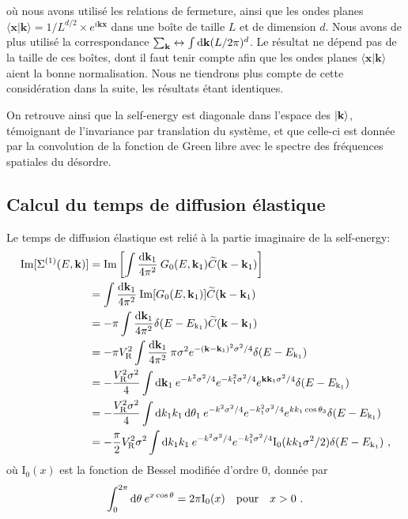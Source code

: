 où nous avons utilisé les relations de fermeture, ainsi que les ondes planes $\langle\mathbf{x}|\mathbf{k}\rangle=1/L^{d/2} \times e^{i\mathbf{k}\mathbf{x}}$ dans une boîte de taille $L$ et de dimension $d$. Nous avons de plus utilisé la correspondance $\sum_{\mathbf{k}} \leftrightarrow \int{\mathop{}\mathopen{}\mathrm{d}\mathbf{k} (L/2\pi)^d}$. Le résultat ne dépend pas de la taille de ces boîtes, dont il faut tenir compte afin que les ondes planes $\langle\mathbf{x}|\mathbf{k}\rangle$ aient la bonne normalisation. Nous ne tiendrons plus compte de cette considération dans la suite, les résultats étant identiques.

On retrouve ainsi que la self-energy est diagonale dans l'espace des $\left| \mathbf{k} \right\rangle$, témoignant de l'invariance par translation du système, et que celle-ci est donnée par la convolution de la fonction de Green libre avec le spectre des fréquences spatiales du désordre.


\subsection{Calcul du temps de diffusion élastique}
Le temps de diffusion élastique est relié à la partie imaginaire de la self-energy:
\begin{align}
\mathrm{Im}[\Sigma^{(1)}(E,\mathbf{k})]&= \mathrm{Im} \left[ \int{\frac{\mathop{}\mathopen{}\mathrm{d}\mathbf{k}_{\mathrm{1}}}{4\pi^2}\: G_0(E,\mathbf{k}_{\mathrm{1}}) \widetilde{C}(\mathbf{k}-\mathbf{k}_{\mathrm{1}})}\right] \\ 
&= \int{\frac{\mathop{}\mathopen{}\mathrm{d}\mathbf{k}_{\mathrm{1}}}{4\pi^2}\: \mathrm{Im}[G_0(E,\mathbf{k}_{\mathrm{1}})] \widetilde{C}(\mathbf{k}-\mathbf{k}_{\mathrm{1}})} \\
&= -\pi \int{\frac{\mathop{}\mathopen{}\mathrm{d}\mathbf{k}_{\mathrm{1}}}{4\pi^2} \delta(E-E_{\mathrm{k}_1}) \widetilde{C}(\mathbf{k}-\mathbf{k}_{\mathrm{1}})} \\
&= - \pi V_{\mathrm{R}}^2 \int{\frac{\mathop{}\mathopen{}\mathrm{d}\mathbf{k}_{\mathrm{1}}}{4\pi^2} \: \pi \sigma^2 e^{-(\mathbf{k}-\mathbf{k}_{\mathrm{1}})^2 \sigma^2/4} \delta(E-E_{\mathrm{k}_1})} \\
&=-\frac{V_{\mathrm{R}}^2\sigma^2}{4} \int{\mathop{}\mathopen{}\mathrm{d}\mathbf{k}_{\mathrm{1}} \: e^{-k^2\sigma^2/4} e^{-k_{\mathrm{1}}^2\sigma^2/4} e^{\mathbf{k}\mathbf{k}_{\mathrm{1}}\sigma^2/4} \delta(E-E_{\mathrm{k}_1})}\\
&= -\frac{V_{\mathrm{R}}^2\sigma^2}{4} \int{\mathop{}\mathopen{}\mathrm{d}k_{\mathrm{1}} k_{\mathrm{1}} \mathop{}\mathopen{}\mathrm{d}\theta_{\mathrm{1}} \: e^{-k^2\sigma^2/4} e^{-k_{\mathrm{1}}^2\sigma^2/4} e^{k k_{\mathrm{1}} \cos{\theta_{\mathrm{3}}}} \delta(E-E_{\mathrm{k}_1})} \\
&= -\frac{\pi}{2} V_{\mathrm{R}}^2\sigma^2 \int{\mathop{}\mathopen{}\mathrm{d}k_{\mathrm{1}} k_{\mathrm{1}} \: e^{-k^2\sigma^2/4} e^{-k_{\mathrm{1}}^2\sigma^2/4} \mathrm{I_0}(k k_{\mathrm{1}}\sigma^2/2) \delta(E-E_{\mathrm{k}_1})} \text{ ,}
\end{align}
où $\mathrm{I_0}(x)$ est la fonction de Bessel modifiée d'ordre 0, donnée par
\begin{equation}
\int_{0}^{2\pi}{\mathop{}\mathopen{}\mathrm{d}\theta\:e^{x\cos\theta}}=2\pi \mathrm{I_0}(x) \quad \text{pour} \quad x>0 \text{ .}
\end{equation}

